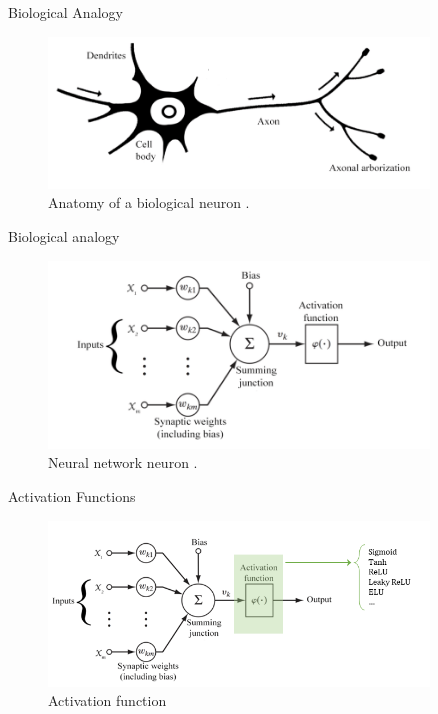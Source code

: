 \begin{frame}{Biological Analogy}
    \begin{figure}[H]
		\centering
		\includegraphics[width=0.9\textwidth]{Images/biological_neuron.png}
		\caption{Anatomy of a biological neuron \cite{biological-and-nn-neuron}.}
	\end{figure}
\end{frame}

\begin{frame}{Biological analogy}
    \begin{figure}[H]
		\centering
		\includegraphics[width=0.9\textwidth]{Images/nn_neuron.png}
		\caption{Neural network neuron \cite{biological-and-nn-neuron}.}
	\end{figure}
\end{frame}

\begin{frame}{Activation Functions}
    \begin{figure}[H]
		\centering
		\includegraphics[width=0.9\textwidth]{Images/activation_function_1.png}
		\caption{Activation function}
	\end{figure}
\end{frame}

